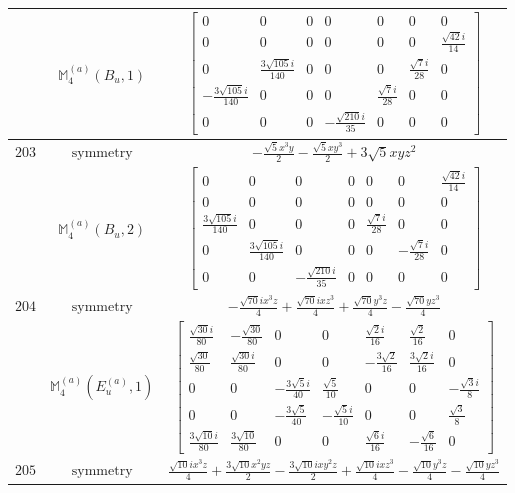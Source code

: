 \documentclass[fleqn,8pt,landscape]{jsarticle}
\begin{document}
\begin{longtable}{ccc}
$  $ & $ \mathbb{M}_{4}^{(a)}(B_{u},1) $ & $ \begin{bmatrix} 0 & 0 & 0 & 0 & 0 & 0 & 0 \\ 0 & 0 & 0 & 0 & 0 & 0 & \frac{\sqrt{42} i}{14} \\ 0 & \frac{3 \sqrt{105} i}{140} & 0 & 0 & 0 & \frac{\sqrt{7} i}{28} & 0 \\ - \frac{3 \sqrt{105} i}{140} & 0 & 0 & 0 & \frac{\sqrt{7} i}{28} & 0 & 0 \\ 0 & 0 & 0 & - \frac{\sqrt{210} i}{35} & 0 & 0 & 0 \end{bmatrix} $ \\ \hline
$ 203 $ & $ \text{symmetry} $ & $ - \frac{\sqrt{5} x^{3} y}{2} - \frac{\sqrt{5} x y^{3}}{2} + 3 \sqrt{5} x y z^{2} $ \\
$  $ & $ \mathbb{M}_{4}^{(a)}(B_{u},2) $ & $ \begin{bmatrix} 0 & 0 & 0 & 0 & 0 & 0 & \frac{\sqrt{42} i}{14} \\ 0 & 0 & 0 & 0 & 0 & 0 & 0 \\ \frac{3 \sqrt{105} i}{140} & 0 & 0 & 0 & \frac{\sqrt{7} i}{28} & 0 & 0 \\ 0 & \frac{3 \sqrt{105} i}{140} & 0 & 0 & 0 & - \frac{\sqrt{7} i}{28} & 0 \\ 0 & 0 & - \frac{\sqrt{210} i}{35} & 0 & 0 & 0 & 0 \end{bmatrix} $ \\ \hline
$ 204 $ & $ \text{symmetry} $ & $ - \frac{\sqrt{70} i x^{3} z}{4} + \frac{\sqrt{70} i x z^{3}}{4} + \frac{\sqrt{70} y^{3} z}{4} - \frac{\sqrt{70} y z^{3}}{4} $ \\
$  $ & $ \mathbb{M}_{4}^{(a)}(E_{u}^{(a)},1) $ & $ \begin{bmatrix} \frac{\sqrt{30} i}{80} & - \frac{\sqrt{30}}{80} & 0 & 0 & \frac{\sqrt{2} i}{16} & \frac{\sqrt{2}}{16} & 0 \\ \frac{\sqrt{30}}{80} & \frac{\sqrt{30} i}{80} & 0 & 0 & - \frac{3 \sqrt{2}}{16} & \frac{3 \sqrt{2} i}{16} & 0 \\ 0 & 0 & - \frac{3 \sqrt{5} i}{40} & \frac{\sqrt{5}}{10} & 0 & 0 & - \frac{\sqrt{3} i}{8} \\ 0 & 0 & - \frac{3 \sqrt{5}}{40} & - \frac{\sqrt{5} i}{10} & 0 & 0 & \frac{\sqrt{3}}{8} \\ \frac{3 \sqrt{10} i}{80} & \frac{3 \sqrt{10}}{80} & 0 & 0 & \frac{\sqrt{6} i}{16} & - \frac{\sqrt{6}}{16} & 0 \end{bmatrix} $ \\ \hline
$ 205 $ & $ \text{symmetry} $ & $ \frac{\sqrt{10} i x^{3} z}{4} + \frac{3 \sqrt{10} x^{2} y z}{2} - \frac{3 \sqrt{10} i x y^{2} z}{2} + \frac{\sqrt{10} i x z^{3}}{4} - \frac{\sqrt{10} y^{3} z}{4} - \frac{\sqrt{10} y z^{3}}{4} $ \\

\end{longtable}
\end{document}
